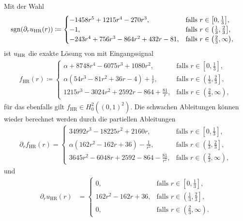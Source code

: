 Mit der Wahl
\begin{align*}
  \operatorname{sgn}&(\partial_r u_\textrm{HR}(r)) 
  \coloneqq 
  \begin{cases}
    -1458r^5 + 1215r^4 - 270r^3, 
    & \text{falls } r\in\left[0, \frac{1}{3}\right]\!,\\
    -1,
    & \text{falls } r\in\left(\frac{1}{3}, \frac{2}{3}\right]\!,\\
    -243r^4 + 756r^3 - 864r^2 + 432r - 81, 
    & \text{falls } r\in\left(\frac{2}{3}, \infty\right)\!,
  \end{cases}
\end{align*}
ist $u_\textup{HR}$ die exakte Lösung von  mit
Eingangssignal
\begin{align*}
  f_\textrm{HR}(r)\coloneqq 
  \begin{cases}
    \alpha + 8748r^4 - 6075r^3 + 1080r^2, 
    & \text{falls } r\in\left[0, \frac{1}{3}\right]\!,\\
    \alpha\left(54r^3 - 81r^2 + 36r - 4\right) + \frac{1}{r}, 
    & \text{falls } r\in\left(\frac{1}{3}, \frac{2}{3}\right]\!,\\
    1215r^3 - 3024r^2 + 2592r - 864 + \frac{81}{r}, 
    & \text{falls } r\in\left(\frac{2}{3}, \infty\right)\!,
  \end{cases}
\end{align*}
für das ebenfalls gilt $f_\textrm{HR}\in H^2_0\left((0,1)^2\right)$.
Die schwachen Ableitungen können wieder berechnet werden durch 
die partiellen Ableitungen
\begin{align*}
  \partial_r f_\textrm{HR}(r) =
  \begin{cases}
    34992r^3 - 18225r^2 + 2160r, 
    & \text{falls } r\in\left[0, \frac{1}{3}\right]\!,\\
    \alpha\left(162r^2 - 162r + 36\right) - \frac{1}{r^2}, 
    & \text{falls } r\in\left(\frac{1}{3}, \frac{2}{3}\right]\!,\\
    3645r^2 - 6048r + 2592 - 864 - \frac{81}{r^2}, 
    & \text{falls } r\in\left(\frac{2}{3}, \infty\right)\!,
  \end{cases}
\end{align*}
und
\begin{align*}
  \partial_r u_\textrm{HR}(r) &=
  \begin{cases}
    0,
    & \text{falls } r\in\left[0, \frac{1}{3}\right]\!,\\
    162r^2 - 162r + 36, 
    & \text{falls } r\in\left(\frac{1}{3}, \frac{2}{3}\right]\!,\\
    0, 
    & \text{falls } r\in\left(\frac{2}{3}, \infty\right)\!.
  \end{cases}
\end{align*}
